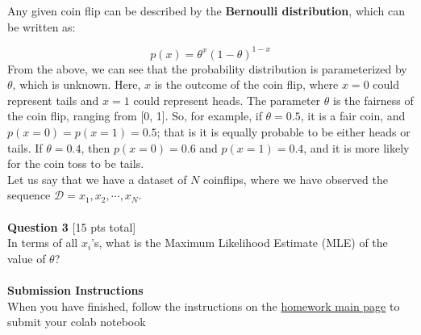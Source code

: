 \documentclass[paper=a4, fontsize=11pt]{scrartcl} %
\begin{document}
Any given coin flip can be described by the \textbf{Bernoulli distribution}, which can be written as:

\begin{equation}
p(x) = \theta^x (1 - \theta)^{1-x}
\end{equation}
From the above, we can see that the probability distribution is parameterized by $\theta$, which is unknown. Here, $x$ is the outcome of the coin flip, where $x=0$ could represent tails and $x=1$ could represent heads. The parameter $\theta$ is the fairness of the coin flip, ranging from [0, 1]. So, for example, if $\theta = 0.5$, it is a fair coin, and $p(x = 0) = p(x = 1) = 0.5$; that is it is equally probable to be either heads or tails. If $\theta = 0.4$, then $p(x = 0) = 0.6$ and $p(x=1) = 0.4$, and it is more likely for the coin toss to be tails.\\

Let us say that we have a dataset of $N$ coinflips, where we have observed the sequence $\mathcal{D} = x_1, x_2, \cdots, x_N$. \\
\\

{\Large \textbf{Question 3} [15 pts total]} \\

In terms of all $x_i$'s, what is the Maximum Likelihood Estimate (MLE) of the value of $\theta$?\\
\\


{\huge \textbf{Submission Instructions}} \\

When you have finished, follow the instructions on the \href{https://course.ccs.neu.edu/cs6220/homework-3/}{ homework main page} to submit your colab notebook

\end{document}
